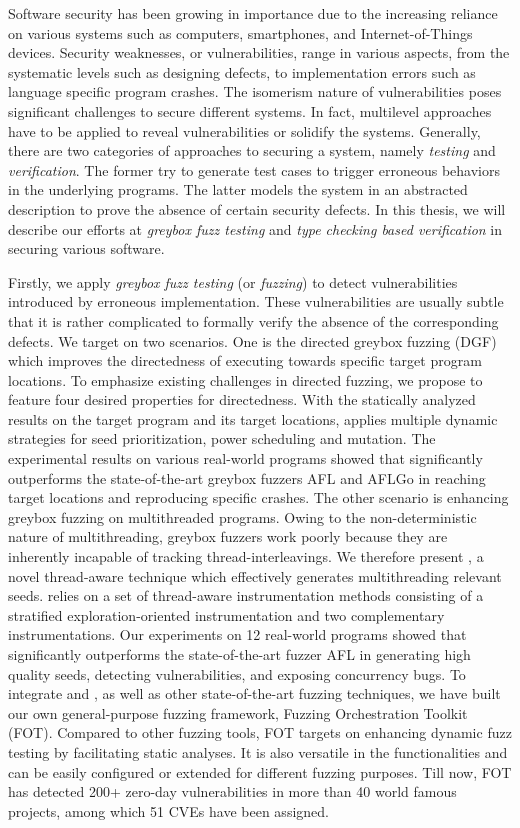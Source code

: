 Software security has been growing in importance due to the increasing reliance on various systems such as computers, smartphones, and Internet-of-Things devices. Security weaknesses, or vulnerabilities, range in various aspects, from the systematic levels such as designing defects, to implementation errors such as language specific program crashes. The isomerism nature of vulnerabilities poses significant challenges to secure different systems. In fact, multilevel approaches have to be applied to reveal vulnerabilities or solidify the systems. Generally, there are two categories of approaches to securing a system, namely \emph{testing} and \emph{verification}. The former try to generate test cases to trigger erroneous behaviors in the underlying programs. The latter models the system in an abstracted description to prove the absence of certain security defects.
  In this thesis, we will describe our efforts at \emph{greybox fuzz testing} and \emph{type checking based verification} in securing various software.

Firstly, we apply \emph{greybox fuzz testing} (or \emph{fuzzing}) to detect vulnerabilities introduced by erroneous implementation. These vulnerabilities are usually subtle that it is rather complicated to formally verify the absence of the corresponding defects. We target on two scenarios.
One is the directed greybox fuzzing (DGF) which improves the directedness of executing towards specific target program locations. To emphasize existing challenges in \mbox{directed} fuzzing, we propose \dFOT to feature four desired properties for directedness. With the statically analyzed results on the target program and its target locations, \dFOT applies multiple dynamic strategies for seed prioritization, power scheduling and \mbox{mutation}. The experimental results on various real-world \mbox{programs} showed that \dFOT significantly outperforms the state-of-the-art greybox fuzzers AFL and AFLGo in reaching target locations and reproducing specific crashes.
The other scenario is enhancing greybox fuzzing on multithreaded programs. Owing to the non-deterministic nature of multithreading, greybox fuzzers work poorly because they are inherently incapable of tracking thread-interleavings. We therefore present \mtfuzz, a novel thread-aware technique which effectively generates multithreading relevant seeds. \mtfuzz relies on a set of thread-aware instrumentation methods consisting of a stratified exploration-oriented instrumentation and two complementary instrumentations. Our experiments on 12 real-world programs showed that \mtfuzz significantly outperforms the state-of-the-art fuzzer AFL in generating high quality seeds, detecting vulnerabilities, and exposing concurrency bugs.
To integrate \dFOT and \mtfuzz, as well as other state-of-the-art fuzzing techniques, we have built our own general-purpose fuzzing framework, Fuzzing Orchestration Toolkit (FOT). Compared to other fuzzing tools, FOT targets on enhancing dynamic fuzz testing by facilitating static analyses. It is  also versatile in the functionalities and can be easily configured or extended for different fuzzing purposes. Till now, FOT has detected 200+ zero-day vulnerabilities in more than 40 world famous projects, among which 51 CVEs have been assigned.

